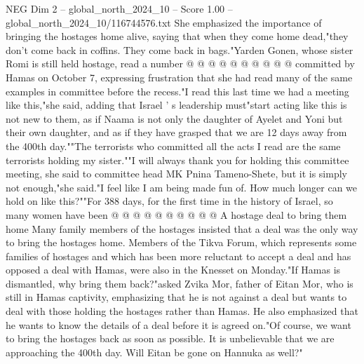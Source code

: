 \begin{textsample}{NEG Dim 2 – global\_north\_2024\_10 – Score 1.00 – global\_north\_2024\_10/116744576.txt}
She emphasized the importance of bringing the hostages home alive, saying that when they come home dead,"they don't come back in coffins.
They come back in bags."Yarden Gonen, whose sister Romi is still held hostage, read a number @ @ @ @ @ @ @ @ @ @ committed by Hamas on October 7, expressing frustration that she had read many of the same examples in committee before the recess."I read this last time we had a meeting like this,"she said, adding that Israel ' s leadership must"start acting like this is not new to them, as if Naama is not only the daughter of Ayelet and Yoni but their own daughter, and as if they have grasped that we are 12 days away from the 400th day.""The terrorists who committed all the acts I read are the same terrorists holding my sister.""I will always thank you for holding this committee meeting, she said to committee head MK Pnina Tameno-Shete, but it is simply not enough,"she said."I feel like I am being made fun of.
How much longer can we hold on like this?""For 388 days, for the first time in the history of Israel, so many women have been @ @ @ @ @ @ @ @ @ @ A hostage deal to bring them home Many family members of the hostages insisted that a deal was the only way to bring the hostages home.
Members of the Tikva Forum, which represents some families of hostages and which has been more reluctant to accept a deal and has opposed a deal with Hamas, were also in the Knesset on Monday."If Hamas is dismantled, why bring them back?"asked Zvika Mor, father of Eitan Mor, who is still in Hamas captivity, emphasizing that he is not against a deal but wants to deal with those holding the hostages rather than Hamas.
He also emphasized that he wants to know the details of a deal before it is agreed on."Of course, we want to bring the hostages back as soon as possible.
It is unbelievable that we are approaching the 400th day.
Will Eitan be gone on Hannuka as well?"

\end{textsample}
